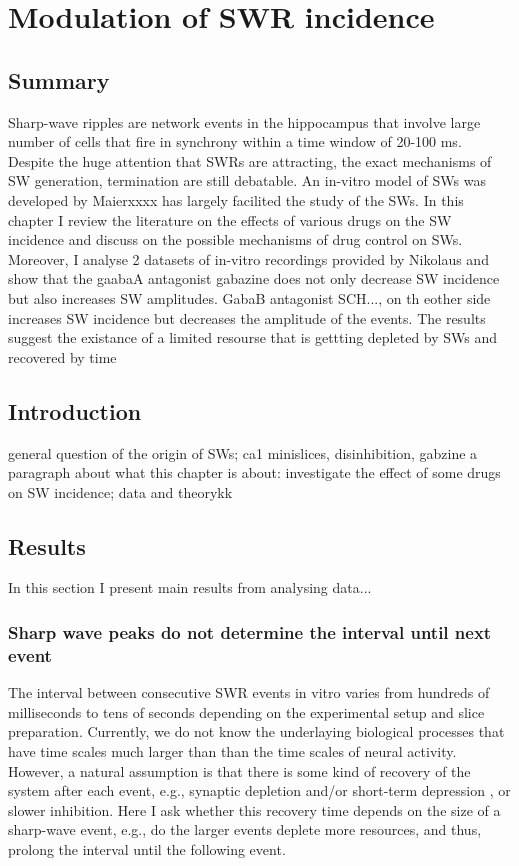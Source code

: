 \chapter{Modulation of SWR incidence}

\section{Summary}

  Sharp-wave ripples are network events in the hippocampus that involve large
  number of cells that fire in synchrony within a time window of 20-100 ms.
  Despite the huge attention that SWRs are attracting, the exact mechanisms of SW
  generation, termination are still debatable.  An in-vitro model of SWs was
  developed by Maierxxxx has largely facilited the study of the SWs. In this
  chapter I review the literature on the effects of various drugs on the SW
  incidence and discuss on the possible mechanisms of drug control on SWs.
  Moreover, I analyse 2 datasets of in-vitro recordings provided by Nikolaus and
  show that the gaabaA antagonist gabazine does not only decrease SW incidence
  but also increases SW amplitudes. GabaB antagonist SCH..., on th eother side
  increases SW incidence but decreases the amplitude of the events. The results
  suggest the existance of a limited resourse that is gettting depleted by SWs
  and recovered by time


\section{Introduction}
  general question of the origin of SWs; ca1 minislices, disinhibition, gabzine 
  a paragraph about what this chapter is about: investigate the effect of some drugs
  on SW incidence; data and theorykk
\section{Results}
  In  this section I present main results from analysing data...

  \subsection{Sharp wave peaks do not determine the interval until next event }
    \label{gabazine_invitro}

    The interval between consecutive SWR events in vitro varies from hundreds
    of milliseconds to tens of seconds depending on the experimental setup and
    slice preparation. Currently, we do not know the underlaying biological
    processes that have time scales much larger than than the time scales of
    neural activity. However, a natural assumption is that there is some kind
    of recovery of the system after each event, e.g., synaptic depletion and/or
    short-term depression \citep{Romani2015, Kohus2016}, or slower inhibition.
    Here I ask whether this recovery time depends on the size of a sharp-wave
    event, e.g., do the larger events deplete more resources, and thus, prolong
    the interval until the following event.


